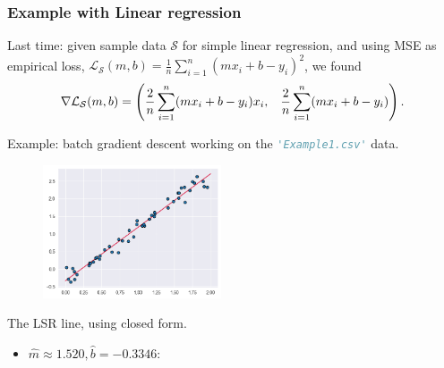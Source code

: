 \documentclass{beamer}
\theoremstyle{example}
\begin{document}
\begin{frame}
\frametitle{Example with Linear regression}
    Last time: given sample data $\mathcal S$ for simple linear regression, and using MSE as empirical loss, $\mathcal L_{\mathcal S}(m,b) = \frac1n\sum_{i=1}^n(mx_i + b - y_i)^2$, we found 
        \[\nabla\mathcal L_{\mathcal S}(m,b) = 
        {\footnotesize
        \left( \frac{2}{n}\sum_{i=1}^n(mx_i + b - y_i)x_i, \quad \frac{2}{n}\sum_{i=1}^n(mx_i + b - y_i) \right).
        }
        \]
    
    \pause
    Example: batch gradient descent working on the \lstinline[language=Python, stringstyle=\ttfamily\color{strings}]{'Example1.csv'} data.

    \begin{figure}
        \includegraphics[width=0.47\textwidth]{../../Images/example1-lsrline.png}
    \end{figure}
    \phantom{line} \newline 
    \vfill
    The LSR line, using closed form. 
    \begin{itemize}
        \item $\hat{m}\approx 1.520, \hat{b}=-0.3346$:
    \end{itemize}
    \vspace{48pt}
    \vfill
\end{frame}
\end{document}

